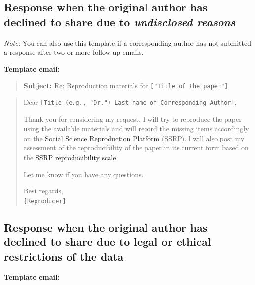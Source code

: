 \documentclass[
]{book}
\begin{document}
\hypertarget{response-when-the-original-author-has-declined-to-share-due-to-undisclosed-reasons}{%
\subsection{\texorpdfstring{Response when the original author has declined to share due to \emph{undisclosed reasons}}{Response when the original author has declined to share due to undisclosed reasons}}\label{response-when-the-original-author-has-declined-to-share-due-to-undisclosed-reasons}}

\emph{Note:} You can also use this template if a corresponding author has not submitted a response after two or more follow-up emails.

\textbf{Template email:}

\begin{quote}
\textbf{Subject:} Re: Reproduction materials for \texttt{{[}"Title\ of\ the\ paper"{]}}
\end{quote}

\begin{quote}
Dear \texttt{{[}Title\ (e.g.,\ "Dr.")\ Last\ name\ of\ Corresponding\ Author{]}},

Thank you for considering my request. I will try to reproduce the paper using the available materials and will record the missing items accordingly on the \href{https://www.socialsciencereproduction.org/}{Social Science Reproduction Platform} (SSRP). l will also post my assessment of the reproducibility of the paper in its current form based on the \href{https://bitss.github.io/ACRE/assessment.html\#levels-of-computational-reproducibility-for-a-specific-output}{SSRP reproducibility scale}.

Let me know if you have any questions.

Best regards,\\
\texttt{{[}Reproducer{]}}
\end{quote}

\hypertarget{response-when-the-original-author-has-declined-to-share-due-to-legal-or-ethical-restrictions-of-the-data}{%
\subsection{Response when the original author has declined to share due to legal or ethical restrictions of the data}\label{response-when-the-original-author-has-declined-to-share-due-to-legal-or-ethical-restrictions-of-the-data}}

\textbf{Template email:}
\end{document}

